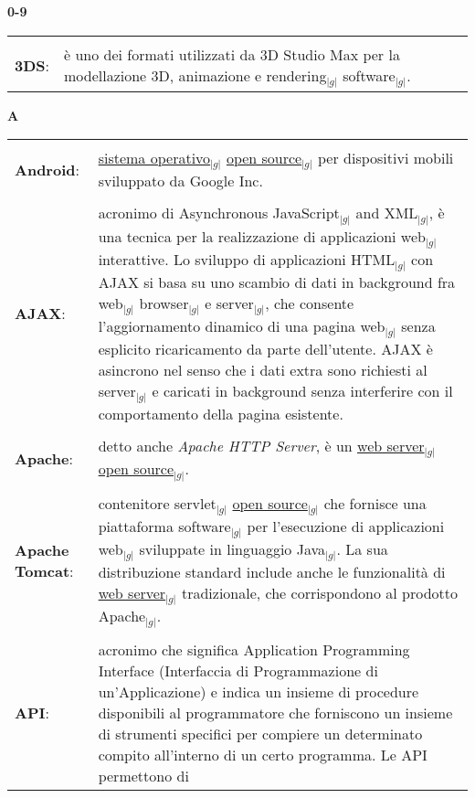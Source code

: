 \hfill\Huge{\textbf{0-9}}\\
\normalsize
	\begin{longtable}{p{} p{}} 
	    \toprule
	    \\
	    \textbf{3DS}:	&	è uno dei formati utilizzati da 3D Studio Max per la modellazione 3D, animazione e rendering$_{|g|}$ software$_{|g|}$.\\
	\end{longtable}
\newpage

\hfill\Huge{\textbf{A}}\\
\normalsize
	\begin{longtable}{p{} p{}} 
	    \toprule
	    \\
	    \textbf{Android}:		&	\underline{sistema operativo}$_{|g|}$ \underline{open source}$_{|g|}$ per dispositivi mobili sviluppato da Google Inc.\\
	    \\
	    \textbf{AJAX}: 		&	acronimo di Asynchronous JavaScript$_{|g|}$ and XML$_{|g|}$, è una tecnica per la realizzazione di applicazioni web$_{|g|}$ interattive. Lo sviluppo di applicazioni HTML$_{|g|}$ con AJAX 
						si basa su uno scambio di dati in background fra web$_{|g|}$ browser$_{|g|}$ e server$_{|g|}$, che consente l’aggiornamento dinamico di una pagina web$_{|g|}$ senza esplicito ricaricamento 
						da parte dell’utente. AJAX è asincrono nel senso che i dati extra sono richiesti al server$_{|g|}$ e caricati in  background senza interferire con il comportamento della pagina 
						esistente.\\
	    \\
	    \textbf{Apache}:		&	detto anche \textit{Apache HTTP Server}, è un \underline{web server}$_{|g|}$ \underline{open source}$_{|g|}$.\\
	    \\
	    \textbf{Apache Tomcat}: 	&	contenitore servlet$_{|g|}$ \underline{open source}$_{|g|}$ che fornisce una piattaforma software$_{|g|}$ per l’esecuzione di applicazioni web$_{|g|}$ sviluppate in linguaggio Java$_{|g|}$. 
						La sua distribuzione standard include anche le funzionalità di \underline{web server}$_{|g|}$ tradizionale, che corrispondono al prodotto Apache$_{|g|}$.\\
	    \\
	    \textbf{API}:		&	acronimo che significa Application Programming Interface (Interfaccia di Programmazione di un’Applicazione) e indica un insieme di procedure disponibili al 
						programmatore che forniscono un insieme di strumenti specifici per compiere un determinato compito all’interno di un certo programma. Le API permettono di 

\end{longtable}
